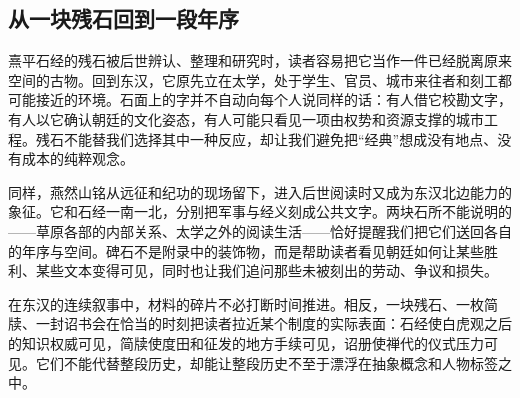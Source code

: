 \subsection{从一块残石回到一段年序}

熹平石经的残石被后世辨认、整理和研究时，读者容易把它当作一件已经脱离原来空间的古物。回到东汉，它原先立在太学，处于学生、官员、城市来往者和刻工都可能接近的环境。石面上的字并不自动向每个人说同样的话：有人借它校勘文字，有人以它确认朝廷的文化姿态，有人可能只看见一项由权势和资源支撑的城市工程。残石不能替我们选择其中一种反应，却让我们避免把“经典”想成没有地点、没有成本的纯粹观念。

同样，燕然山铭从远征和纪功的现场留下，进入后世阅读时又成为东汉北边能力的象征。它和石经一南一北，分别把军事与经义刻成公共文字。两块石所不能说明的——草原各部的内部关系、太学之外的阅读生活——恰好提醒我们把它们送回各自的年序与空间。碑石不是附录中的装饰物，而是帮助读者看见朝廷如何让某些胜利、某些文本变得可见，同时也让我们追问那些未被刻出的劳动、争议和损失。

在东汉的连续叙事中，材料的碎片不必打断时间推进。相反，一块残石、一枚简牍、一封诏书会在恰当的时刻把读者拉近某个制度的实际表面：石经使白虎观之后的知识权威可见，简牍使度田和征发的地方手续可见，诏册使禅代的仪式压力可见。它们不能代替整段历史，却能让整段历史不至于漂浮在抽象概念和人物标签之中。
